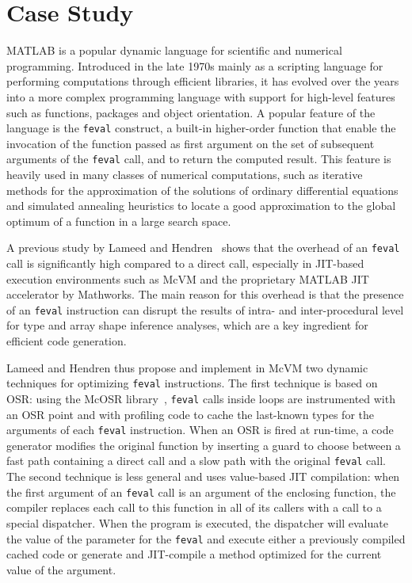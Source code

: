 \section{Case Study}
\label{case-study}

MATLAB is a popular dynamic language for scientific and numerical programming. Introduced in the late 1970s mainly as a scripting language for performing computations through efficient libraries, it has evolved over the years into a more complex programming language with support for high-level features such as functions, packages and object orientation. A popular feature of the language is the {\tt feval} construct, a built-in higher-order function that enable the invocation of the function passed as first argument on the set of subsequent arguments of the {\tt feval} call, and to return the computed result. This feature is heavily used in many classes of numerical computations, such as iterative methods for the approximation of the solutions of ordinary differential equations and simulated annealing heuristics to locate a good approximation to the global optimum of a function in a large search space.

A previous study by Lameed and Hendren~\cite{lameed2013feval} shows that the overhead of an {\tt feval} call is significantly high compared to a direct call, especially in JIT-based execution environments such as McVM and the proprietary MATLAB JIT accelerator by Mathworks. The main reason for this overhead is that the presence of an {\tt feval} instruction can disrupt the results of intra- and inter-procedural level for type and array shape inference analyses, which are a key ingredient for efficient code generation.

Lameed and Hendren thus propose and implement in McVM two dynamic techniques for optimizing {\tt feval} instructions. The first technique is based on OSR: using the McOSR library~\cite{lameed2013modular}, {\tt feval} calls inside loops are instrumented with an OSR point and with profiling code to cache the last-known types for the arguments of each {\tt feval} instruction. When an OSR is fired at run-time, a code generator modifies the original function by inserting a guard to choose between a fast path containing a direct call and a slow path with the original {\tt feval} call. The second technique is less general and uses value-based JIT compilation: when the first argument of an {\tt feval} call is an argument of the enclosing function, the compiler replaces each call to this function in all of its callers with a call to a special dispatcher. When the program is executed, the dispatcher will evaluate the value of the parameter for the {\tt feval} and execute either a previously compiled cached code or generate and JIT-compile a method optimized for the current value of the argument.

